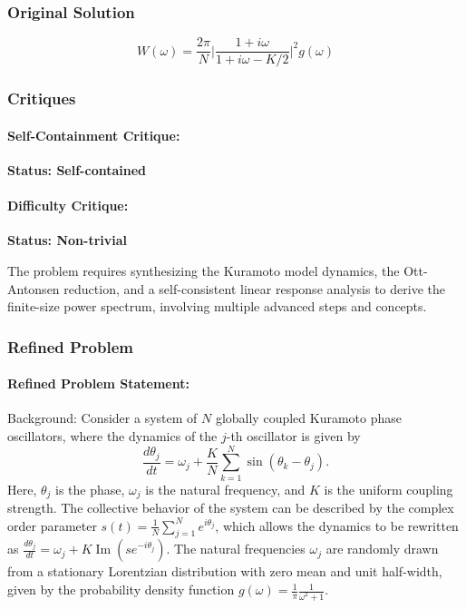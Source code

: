 \documentclass[10pt]{article}
\begin{document}
\subsubsection*{Original Solution}
\[ W(\omega)=\frac{2\pi}{N}\bigg|\frac{1+i\omega}{1+i\omega-K/2}\bigg|^2 g(\omega) \]

\subsubsection*{Critiques}
\paragraph*{Self-Containment Critique:}
\textcolor{pass}{\textbf{Status: Self-contained}}




\paragraph*{Difficulty Critique:}
\textcolor{pass}{\textbf{Status: Non-trivial}}

The problem requires synthesizing the Kuramoto model dynamics, the Ott-Antonsen reduction, and a self-consistent linear response analysis to derive the finite-size power spectrum, involving multiple advanced steps and concepts.


\subsubsection*{Refined Problem}
\paragraph*{Refined Problem Statement:}
Background:
Consider a system of $N$ globally coupled Kuramoto phase oscillators, where the dynamics of the $j$-th oscillator is given by
$$ \frac{d\theta_j}{dt} = \omega_j + \frac{K}{N}\sum_{k=1}^N \sin(\theta_k - \theta_j). $$
Here, $\theta_j$ is the phase, $\omega_j$ is the natural frequency, and $K$ is the uniform coupling strength. The collective behavior of the system can be described by the complex order parameter $s(t) = \frac{1}{N} \sum_{j=1}^N e^{i \theta_j}$, which allows the dynamics to be rewritten as $\frac{d\theta_j}{dt} = \omega_j + K \operatorname{Im}(s e^{-i\theta_j})$. The natural frequencies $\omega_j$ are randomly drawn from a stationary Lorentzian distribution with zero mean and unit half-width, given by the probability density function $g(\omega) = \frac{1}{\pi}\frac{1}{\omega^2+1}$.
\end{document}
